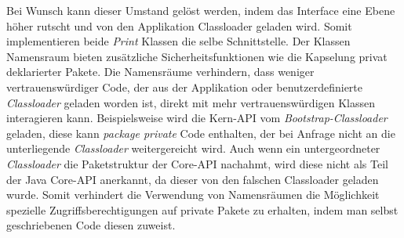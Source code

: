 Bei Wunsch kann dieser Umstand gelöst werden, indem das Interface eine Ebene höher rutscht und von den Applikation Classloader geladen wird. Somit implementieren beide \textit{Print} Klassen die selbe Schnittstelle.   
\bigbreak
Der Klassen Namensraum bieten zusätzliche Sicherheitsfunktionen wie die Kapselung privat deklarierter Pakete. Die Namensräume verhindern, dass weniger vertrauenswürdiger Code, der aus der Applikation oder benutzerdefinierte \textit{Classloader} geladen worden ist, direkt mit mehr vertrauenswürdigen Klassen interagieren kann. Beispielsweise wird die Kern-API vom \textit{Bootstrap-Classloader} geladen, diese kann \textit{package private} Code enthalten, der bei Anfrage nicht an die unterliegende \textit{Classloader} weitergereicht wird. \newline
Auch wenn ein untergeordneter \textit{Classloader} die Paketstruktur der Core-API nachahmt, wird diese nicht als Teil der Java Core-API anerkannt, da dieser von den falschen Classloader geladen wurde. Somit verhindert die Verwendung von Namensräumen die Möglichkeit spezielle Zugriffsberechtigungen auf private Pakete zu erhalten, indem man selbst geschriebenen Code diesen zuweist.

